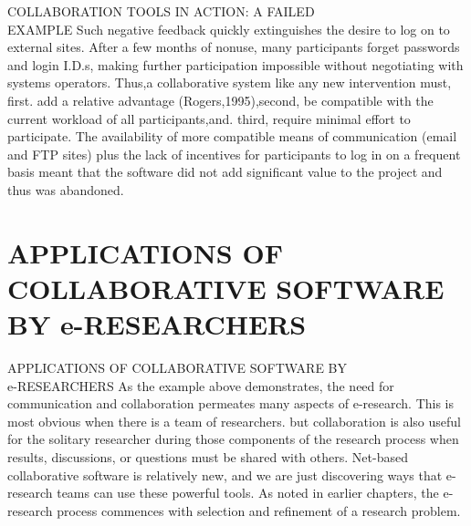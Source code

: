 \documentclass{beamer}
\begin{document}

\begin{frame}[t]{COLLABORATION TOOLS IN ACTION: A FAILED\\ EXAMPLE}
	  Such negative feedback quickly extinguishes the desire to log on to external sites. After a few months of nonuse, many participants forget passwords and login I.D.s, making further participation impossible without negotiating with systems operators. Thus,a collaborative system like any new intervention must, first. add a relative
	  advantage (Rogers,1995),second, be compatible with the current workload of all participants,and. third, require minimal effort to participate. The availability of more compatible means of communication (email and FTP sites) plus the lack of incentives for participants to log in on a frequent basis meant that the software did not add significant value to the project and thus was abandoned.
\end{frame}


\section{APPLICATIONS OF COLLABORATIVE SOFTWARE BY e-RESEARCHERS}


\begin{frame}[t]{APPLICATIONS OF COLLABORATIVE SOFTWARE BY\\ e-RESEARCHERS}
	As the example above demonstrates, the need for communication and collaboration
	permeates many aspects of e-research. This is most obvious when there is a team of
	researchers. but collaboration is also useful for the solitary researcher during those
	components of the research process when results, discussions, or questions must be
	shared with others.	Net-based collaborative software is relatively new, and we are just discovering ways that e-research teams can use these powerful tools. As noted in earlier chapters, the e-research process commences with selection and refinement of a research problem.
\end{frame}

\end{document}
